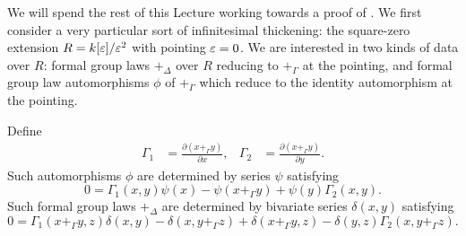 We will spend the rest of this Lecture working towards a proof of .  We first consider a very particular sort of infinitesimal thickening: the square-zero extension \(R = k[\varepsilon] / \varepsilon^2\) with pointing \(\varepsilon = 0\).  We are interested in two kinds of data over \(R\): formal group laws \(+_\Delta\) over \(R\) reducing to \(+_\Gamma\) at the pointing, and formal group law automorphisms \(\phi\) of \(+_\Gamma\) which reduce to the identity automorphism at the pointing.
\begin{lemma}
Define
\begin{align*}
\Gamma_1 & = \frac{\partial(x +_\Gamma y)}{\partial x}, &
\Gamma_2 & = \frac{\partial(x +_\Gamma y)}{\partial y}.
\end{align*}
Such automorphisms \(\phi\) are determined by series \(\psi\) satisfying \[0 = \Gamma_1(x, y) \psi(x) - \psi(x +_\Gamma y) + \psi(y) \Gamma_2(x, y).\]  Such formal group laws \(+_\Delta\) are determined by bivariate series \(\delta(x, y)\) satisfying \[0 = \Gamma_1(x +_\Gamma y, z) \delta(x, y) - \delta(x, y +_\Gamma z) + \delta(x +_\Gamma y, z) - \delta(y, z) \Gamma_2(x, y +_\Gamma z).\]
\end{lemma}
